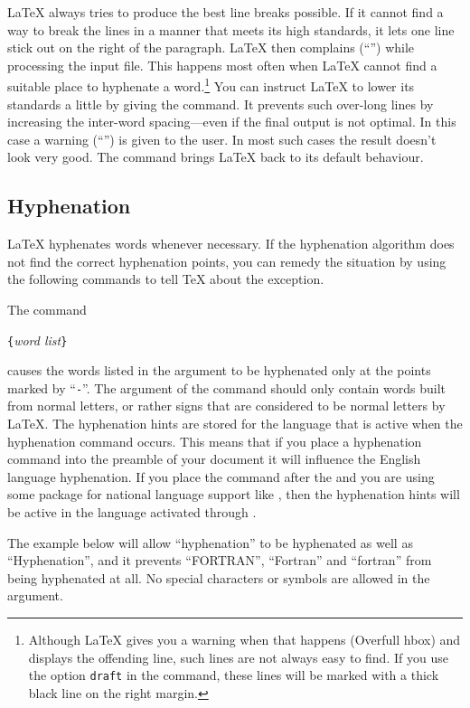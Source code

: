\LaTeX{} always tries to produce the best line breaks possible. If it
cannot find a way to break the lines in a manner that meets its high
standards, it lets one line stick out on the right of the paragraph.
\LaTeX{} then complains (``'') while processing the
input file. This happens most often when \LaTeX{} cannot find a
suitable place to hyphenate a word.\footnote{Although \LaTeX{} gives
  you a warning when that happens (Overfull hbox) and displays the
  offending line, such lines are not always easy to find. If you use
  the option \texttt{draft} in the  command, these
  lines will be marked with a thick black line on the right margin.}
You can instruct \LaTeX{} to lower its standards a little by giving
the  command. It prevents such over-long lines by
increasing the inter-word spacing---even if the final output is not
optimal.  In this case a warning (``'') is given to
the user.  In most such cases the result doesn't look very good. The
command  brings \LaTeX{} back to its default behaviour.

\subsection{Hyphenation} \label{hyph}

\LaTeX{} hyphenates words whenever necessary. If the hyphenation
algorithm does not find the correct hyphenation points, you can
remedy the situation by using the following commands to tell \TeX{}
about the exception.

The command
\begin{lscommand}
\verb|{|\emph{word list}\verb|}|
\end{lscommand}
\noindent causes the words listed in the argument to be hyphenated only at
the points marked by ``\verb|-|''.  The argument of the command should only
contain words built from normal letters, or rather signs that are considered
to be normal letters by \LaTeX{}. The hyphenation hints are
stored for the language that is active when the hyphenation command
occurs. This means that if you place a hyphenation command into the preamble
of your document it will influence the English language hyphenation. If you
place the command after the \verb|| and you are using some
package for national language support like , then the hyphenation
hints will be active in the language activated through .

The example below will allow ``hyphenation'' to be hyphenated as well as
``Hyphenation'', and it prevents ``FORTRAN'', ``Fortran'' and ``fortran''
from being hyphenated at all.  No special characters or symbols are allowed
in the argument.

